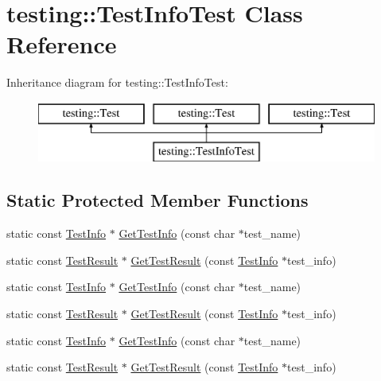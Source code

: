 \hypertarget{classtesting_1_1_test_info_test}{}\section{testing\+::Test\+Info\+Test Class Reference}
\label{classtesting_1_1_test_info_test}
Inheritance diagram for testing\+::Test\+Info\+Test\+:\begin{figure}[H]
\begin{center}
\leavevmode
\includegraphics[height=2.000000cm]{d8/dd2/classtesting_1_1_test_info_test}
\end{center}
\end{figure}
\subsection*{Static Protected Member Functions}
\begin{DoxyCompactItemize}
\item 
static const \mbox{\hyperlink{classtesting_1_1_test_info}{Test\+Info}} $\ast$ \mbox{\hyperlink{classtesting_1_1_test_info_test_a4140c1302bf53c7f1375a23923624f04}{Get\+Test\+Info}} (const char $\ast$test\+\_\+name)
\item 
static const \mbox{\hyperlink{classtesting_1_1_test_result}{Test\+Result}} $\ast$ \mbox{\hyperlink{classtesting_1_1_test_info_test_a154b3679b1aa00ad037ce46eb60d18c3}{Get\+Test\+Result}} (const \mbox{\hyperlink{classtesting_1_1_test_info}{Test\+Info}} $\ast$test\+\_\+info)
\item 
static const \mbox{\hyperlink{classtesting_1_1_test_info}{Test\+Info}} $\ast$ \mbox{\hyperlink{classtesting_1_1_test_info_test_a4140c1302bf53c7f1375a23923624f04}{Get\+Test\+Info}} (const char $\ast$test\+\_\+name)
\item 
static const \mbox{\hyperlink{classtesting_1_1_test_result}{Test\+Result}} $\ast$ \mbox{\hyperlink{classtesting_1_1_test_info_test_a154b3679b1aa00ad037ce46eb60d18c3}{Get\+Test\+Result}} (const \mbox{\hyperlink{classtesting_1_1_test_info}{Test\+Info}} $\ast$test\+\_\+info)
\item 
static const \mbox{\hyperlink{classtesting_1_1_test_info}{Test\+Info}} $\ast$ \mbox{\hyperlink{classtesting_1_1_test_info_test_a4140c1302bf53c7f1375a23923624f04}{Get\+Test\+Info}} (const char $\ast$test\+\_\+name)
\item 
static const \mbox{\hyperlink{classtesting_1_1_test_result}{Test\+Result}} $\ast$ \mbox{\hyperlink{classtesting_1_1_test_info_test_a154b3679b1aa00ad037ce46eb60d18c3}{Get\+Test\+Result}} (const \mbox{\hyperlink{classtesting_1_1_test_info}{Test\+Info}} $\ast$test\+\_\+info)
\end{DoxyCompactItemize}
